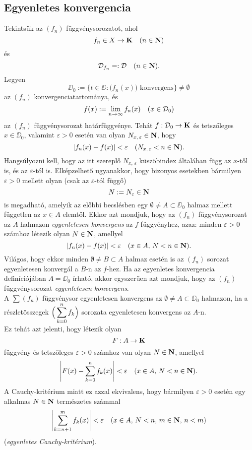 \subsection{Egyenletes konvergencia}
Tekintsük az $(f_n)$ függvénysorozatot, ahol
\[
	f_n \in X \to \mathbf{K} \quad (n \in \mathbf{N})
\]
és
\[
	\mathcal{D}_{f_n} =: \mathcal{D} \quad (n \in \mathbf{N}).
\]
Legyen
\[
	\DD_0 := \Big\{ t \in \DD : \big( f_n(x)\big) \text { konvergens} \Big\} \neq \emptyset
\]
az $(f_n)$ konvergenciatartománya, és 
\[
	f(x) := \lim_{n \to \infty} f_n(x) \quad (x \in \mathcal{D}_0)
\]
az $(f_n)$ függvénysorozat határfüggvénye. Tehát $f : \mathcal{D}_0 \to \mathbf{K}$ és tetszőleges $x \in \DD_0$, valamint $\varepsilon > 0$ esetén van olyan $N_{x, \, \varepsilon} \in \mathbf{N}$, hogy
\[
	|f_n(x) - f(x)| < \varepsilon \quad (N_{x, \, \varepsilon} < n \in \mathbf{N}).
\]
Hangsúlyozni kell, hogy az itt szereplő $N_{x, \, \varepsilon}$ küszöbindex általában függ az $x$-től is, és az $\varepsilon$-tól is. Elképzelhető ugyanakkor, hogy bizonyos esetekben bármilyen $\varepsilon > 0$ mellett olyan (csak az $\varepsilon$-tól függő)
\[
	N := N_\varepsilon \in \mathbf{N}
\]
is megadható, amelyik az előbbi becslésben egy $\emptyset \neq A \subset \DD_0$ halmaz mellett független az $x \in A$ elemtől. Ekkor azt mondjuk, hogy az $(f_n)$ függvénysorozat az $A$ halmazon \textit{egyenletesen konvergens} az $f$ függvényhez, azaz: minden $\varepsilon > 0$ számhoz létezik olyan $N \in \mathbf{N}$, amellyel
\[
	|f_n(x) - f(x)| < \varepsilon \quad (x \in A, \, N < n \in \mathbf{N}).
\]
Világos, hogy ekkor minden $\emptyset \neq B \subset A$ halmaz esetén is az $(f_n)$ sorozat egyenletesen konvergál a $B$-n az $f$-hez. Ha az egyenletes konvergencia definíciójában $A = \DD_0$ írható, akkor egyszerűen azt mondjuk, hogy az $(f_n)$ függvénysorozat \textit{egyenletesen konvergens}.\\

A $\sum(f_n)$ függvénysor egyenletesen konvergens az $\emptyset \neq A \subset \DD_0$ halmazon, ha a részletösszegek $\displaystyle \Big( \sum_{k=0}^n f_k \Big)$ sorozata egyenletesen konvergens az $A$-n.\\

Ez tehát azt jelenti, hogy létezik olyan
\[
	F : A \to \mathbf{K}
\]
függvény és tetszőleges $\varepsilon > 0$ számhoz van olyan $N \in \mathbf{N}$, amellyel
\[
	\left| F(x) - \sum_{k=0}^n f_k(x) \right| < \varepsilon \quad (x \in A, \, N < n \in \mathbf{N}).
\]
A Cauchy-kritérium miatt ez azzal ekvivalens, hogy bármilyen $\varepsilon > 0$ esetén egy alkalmas $N \in \mathbf{N}$ természetes számmal
\[
	\left|  \sum_{k=n+1}^m f_k(x) \right| < \varepsilon \quad (x \in A, \, N < n, \, m \in \mathbf{N}, \, n < m)
\]
(\textit{egyenletes Cauchy-kritérium}).